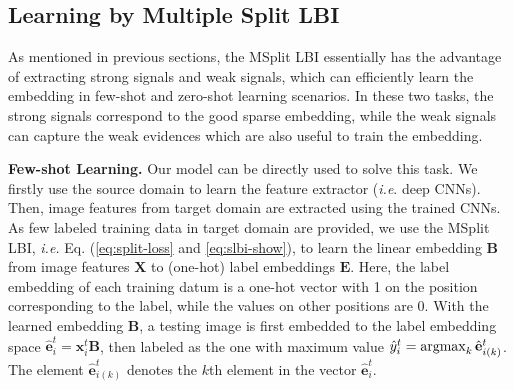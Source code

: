 \documentclass{article}
\begin{document}
\subsection{Learning by Multiple Split LBI\label{subsec:Learning-by-Multiple}}


\label{sec:learningbyLBI} As mentioned in previous sections, the
MSplit LBI essentially has the advantage of extracting strong signals
and weak signals, which can efficiently learn the embedding in few-shot
and zero-shot learning scenarios. In these two tasks, the strong signals
correspond to the good sparse embedding, while the weak signals can
capture the weak evidences which are also useful to train the embedding.


\noindent \textbf{Few-shot Learning.} Our model can be directly used
to solve this task. We firstly use the source domain to learn the
feature extractor (\emph{i.e}. deep CNNs). Then, image features from
target domain are extracted using the trained CNNs. As few labeled
training data in target domain are provided, we use the MSplit LBI,
\emph{i.e.} Eq. (\ref{eq:split-loss} and \ref{eq:slbi-show}), to
learn the linear embedding $\mathbf{B}$ from image features $\mathbf{X}$
to (one-hot) label embeddings $\mathbf{E}$. Here, the label embedding
of each training datum is a one-hot vector with 1 on the position corresponding
to the label, while the values on other positions are 0. With the
learned embedding $\mathbf{B}$, a testing image is first embedded
to the label embedding space $\hat{\mathbf{e}}_{i}^{t}=\mathbf{x}_{i}^{t}\mathbf{B}$,
then labeled as the one with maximum value $\hat{y}_{i}^{t}=\operatorname*{argmax}_{k}\hat{\mathbf{e}}_{i(k)}^{t}$.
The element $\hat{\mathbf{e}}_{i(k)}^{t}$ denotes the $k$th element
in the vector $\hat{\mathbf{e}}_{i}^{t}$.\textbf{ }
\end{document}

